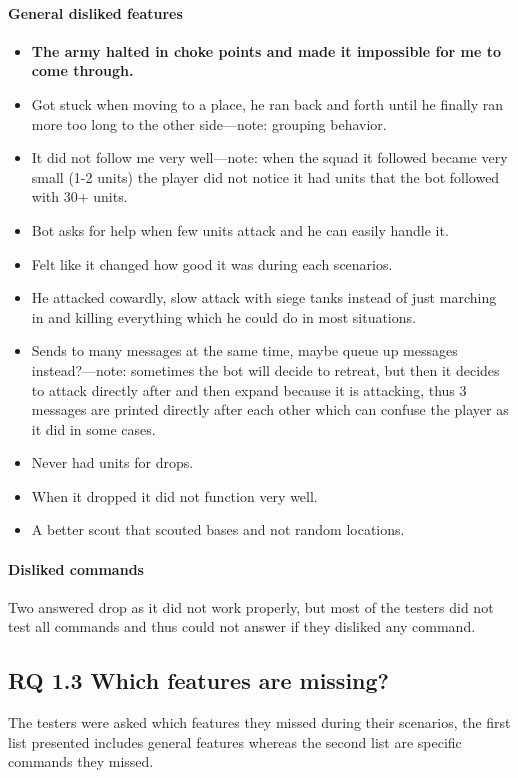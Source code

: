 \paragraph{General disliked features}
\begin{itemize}
	\item \textbf{The army halted in choke points and made it impossible for me to come through.}
	\item Got stuck when moving to a place, he ran back and forth until he finally ran more too long to the other side—note: grouping behavior.
	\item It did not follow me very well—note: when the squad it followed became very small (1-2 units) the player did not notice it had units that the bot followed with 30+ units.
	\item Bot asks for help when few units attack and he can easily handle it.
	\item Felt like it changed how good it was during each scenarios.
	\item He attacked cowardly, slow attack with siege tanks instead of just marching in and killing everything which he could do in most situations.
	\item Sends to many messages at the same time, maybe queue up messages instead?—note: sometimes the bot will decide to retreat, but then it decides to attack directly after and then expand because it is attacking, thus 3 messages are printed directly after each other which can confuse the player as it did in some cases.
	\item Never had units for drops.
	\item When it dropped it did not function very well.
	\item A better scout that scouted bases and not random locations.
\end{itemize}

\paragraph{Disliked commands}Two answered drop as it did not work properly, but most of the testers did not test all commands and thus could not answer if they disliked any command.

\subsection{RQ 1.3 Which features are missing?}
The testers were asked which features they missed during their scenarios, the first list presented includes general features whereas the second list are specific commands they missed.
